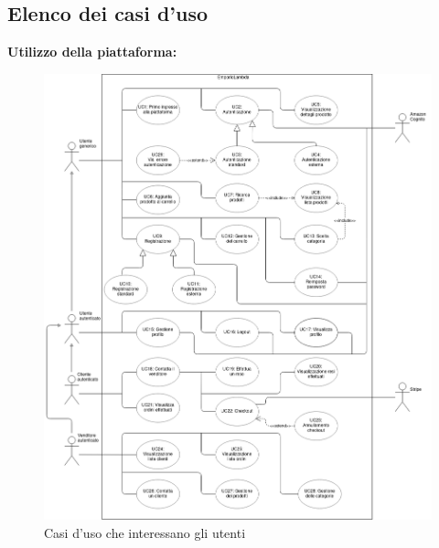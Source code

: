     \subsection{Elenco dei casi d'uso}
        \textbf{Utilizzo della piattaforma:}
        \begin{figure}[!ht]
            \caption{Casi d'uso che interessano gli utenti}
            \vspace{10px}
            \includegraphics[scale=0.44]{../../../Images/AnalisiRequisiti/casiUso}
            \centering
        \end{figure}
        \newpage
        
        
        
        
        
        
        
        
        
        
        
        
        
        
        
        
        
        
        
        
        
        
        
        
        
        
        
               